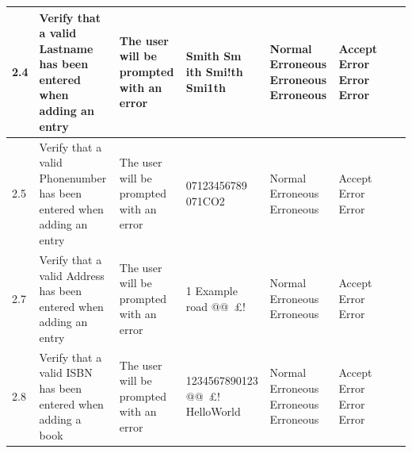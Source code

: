 \begin{landscape}
\begin{center}
\begin{longtable}{|p{1.5cm}|p{2.5cm}|p{2.5cm}|p{2cm}|p{2cm}|p{2cm}|p{2cm}|p{2cm}|}
        2.4 & Verify that a valid Lastname has been entered when adding an entry & The user will be prompted with an error & Smith \newline Sm ith \newline Smi!th \newline Smi1th & Normal \newline Erroneous \newline Erroneous \newline Erroneous & Accept \newline Error \newline Error \newline Error & & \\ \hline
        2.5 & Verify that a valid Phonenumber has been entered when adding an entry & The user will be prompted with an error & 07123456789 \newline 07123123.3 \newline 071CO2 & Normal \newline Erroneous \newline Erroneous & Accept \newline Error \newline Error & & \\ \hline
        2.7 & Verify that a valid Address has been entered when adding an entry & The user will be prompted with an error & 1 Example road \newline @@~£! \newline 1231231 & Normal \newline Erroneous \newline Erroneous & Accept \newline Error \newline Error & & \\ \hline
        2.8 & Verify that a valid ISBN has been entered when adding a book & The user will be prompted with an error & 1234567890123 \newline @@~£! \newline 123 \newline HelloWorld & Normal \newline Erroneous \newline Erroneous \newline Erroneous & Accept \newline Error \newline Error \newline Error & & \\ \hline

\end{longtable}
\end{center}
\end{landscape}
